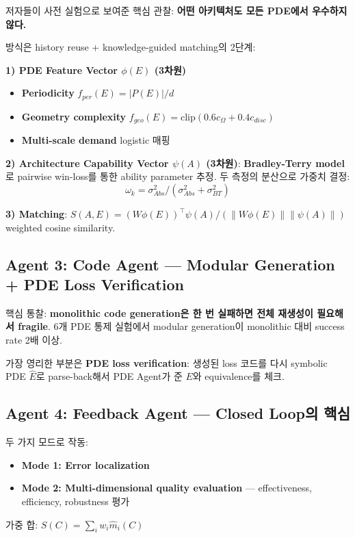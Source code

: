 \documentclass[11pt,a4paper,oneside]{report}
\begin{document}
저자들이 사전 실험으로 보여준 핵심 관찰: \textbf{어떤 아키텍처도 모든 PDE에서 우수하지 않다.}

방식은 history reuse + knowledge-guided matching의 2단계:

\textbf{1) PDE Feature Vector $\phi(E)$ (3차원)}
\begin{itemize}
\item \textbf{Periodicity} $f_{per}(E) = |P(E)|/d$
\item \textbf{Geometry complexity} $f_{geo}(E) = \text{clip}(0.6 c_\Omega + 0.4 c_{disc})$
\item \textbf{Multi-scale demand} logistic 매핑
\end{itemize}

\textbf{2) Architecture Capability Vector $\psi(A)$ (3차원)}: \textbf{Bradley-Terry model}로 pairwise win-loss를 통한 ability parameter 추정. 두 측정의 분산으로 가중치 결정:
\[
\omega_k = \sigma^2_{Abs} / (\sigma^2_{Abs} + \sigma^2_{BT})
\]

\textbf{3) Matching}: $S(A, E) = (W\phi(E))^\top \psi(A) / (\|W\phi(E)\| \|\psi(A)\|)$ weighted cosine similarity.

\subsection{Agent 3: Code Agent --- Modular Generation + PDE Loss Verification}

핵심 통찰: \textbf{monolithic code generation은 한 번 실패하면 전체 재생성이 필요해서 fragile}. 6개 PDE 통제 실험에서 modular generation이 monolithic 대비 success rate 2배 이상.

가장 영리한 부분은 \textbf{PDE loss verification}: 생성된 loss 코드를 다시 symbolic PDE $\hat{E}$로 parse-back해서 PDE Agent가 준 $E$와 equivalence를 체크.

\subsection{Agent 4: Feedback Agent --- Closed Loop의 핵심}

두 가지 모드로 작동:
\begin{itemize}
\item \textbf{Mode 1: Error localization}
\item \textbf{Mode 2: Multi-dimensional quality evaluation} --- effectiveness, efficiency, robustness 평가
\end{itemize}

가중 합: $S(C) = \sum_i w_i \hat{m}_i(C)$
\end{document}
